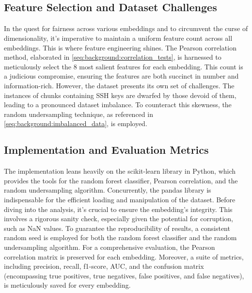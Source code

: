 \subsection{Feature Selection and Dataset Challenges}

\paragraph{}In the quest for fairness across various embeddings and to circumvent the curse of dimensionality, it's imperative to maintain a uniform feature count across all embeddings. This is where feature engineering shines. The Pearson correlation method, elaborated in \ref{seq:background:correlation_tests}, is harnessed to meticulously select the 8 most salient features for each embedding. This count is a judicious compromise, ensuring the features are both succinct in number and information-rich. However, the dataset presents its own set of challenges. The instances of \glspl{chunk} containing SSH keys are dwarfed by those devoid of them, leading to a pronounced dataset imbalance. To counteract this skewness, the random undersampling technique, as referenced in \ref{seq:background:imbalanced_data}, is employed.

\subsection{Implementation and Evaluation Metrics}

\paragraph{}The implementation leans heavily on the scikit-learn library \cite{pedregosa_scikit-learn_2011} in Python, which provides the tools for the random forest classifier, Pearson correlation, and the random undersampling algorithm. Concurrently, the pandas library is indispensable for the efficient loading and manipulation of the dataset. Before diving into the analysis, it's crucial to ensure the embedding's integrity. This involves a rigorous sanity check, especially given the potential for corruption, such as NaN values. To guarantee the reproducibility of results, a consistent random seed is employed for both the random forest classifier and the random undersampling algorithm. For a comprehensive evaluation, the Pearson correlation matrix is preserved for each embedding. Moreover, a suite of metrics, including precision, recall, f1-score, AUC, and the confusion matrix (encompassing true positives, true negatives, false positives, and false negatives), is meticulously saved for every embedding.
